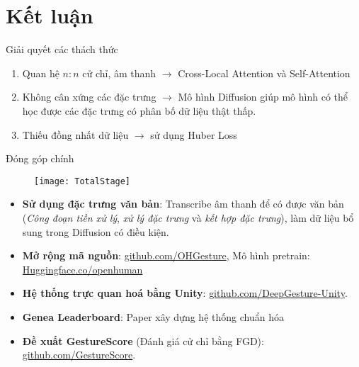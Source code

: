 
\section{Kết luận}

\begin{frame}{Giải quyết các thách thức}
		\begin{enumerate}
			\item Quan hệ $n:n$ cử chỉ, âm thanh $\rightarrow$ Cross-Local Attention và Self-Attention
			\item Không cân xứng các đặc trưng $\rightarrow$ Mô hình Diffusion giúp mô hình có thể học được các đặc trưng có phân bố dữ liệu thật thấp.
				\item Thiếu đồng nhất dữ liệu $\rightarrow$ sử dụng Huber Loss
		\end{enumerate}
\end{frame}

\begin{frame}{Đóng góp chính}
	
	\begin{figure}
		\centering
		\texttt{[image: TotalStage]}
	\end{figure}
	
	\begin{itemize}
		\item \textbf{Sử dụng đặc trưng văn bản}: Transcribe âm thanh để có được văn bản (\textit{Công đoạn tiền xử lý}, \textit{xử lý đặc trưng} và \textit{kết hợp đặc trưng}), làm dữ liệu bổ sung trong Diffusion có điều kiện. 
		
		\item \textbf{Mở rộng mã nguồn}: \hyperlink{https://github.com/hmthanh/OHGesture}{github.com/OHGesture}, Mô hình pretrain: \hyperlink{https://huggingface.co/openhuman/openhuman}{Huggingface.co/openhuman}
		
		\item \textbf{Hệ thống trực quan hoá bằng Unity}: \hyperlink{https://github.com/DeepGesture/deepgesture-unity}{github.com/DeepGesture-Unity}.
		
		\item \textbf{Genea Leaderboard}: Paper xây dựng hệ thống chuẩn hóa
		
		\item \textbf{Đề xuất GestureScore} (Đánh giá cử chỉ bằng FGD): \hyperlink{https://github.com/GestureScore/GestureScore}{github.com/GestureScore}.
	\end{itemize}
\end{frame}

